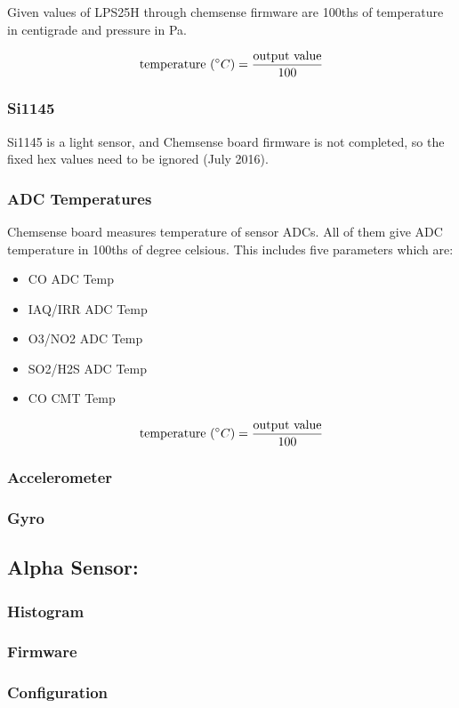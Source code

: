 Given values of LPS25H through chemsense firmware are 100ths of temperature in centigrade and pressure in Pa.

{\centering 
 \[ \text{temperature }(\degree C) = \frac{\text{output value}}{100} \]
}

\subsubsection{ Si1145}

Si1145 is a light sensor, and Chemsense board firmware is not completed, so the fixed hex values need to be ignored (July 2016).

\subsubsection{ ADC Temperatures}
Chemsense board measures temperature of sensor ADCs. All of them give ADC temperature in 100ths of degree celsious. This includes five parameters which are:
 
\begin{itemize}
  \item CO ADC Temp
  \item IAQ/IRR ADC Temp
  \item O3/NO2 ADC Temp
  \item SO2/H2S ADC Temp
  \item CO CMT Temp
\end{itemize}


{\centering 
 \[ \text{temperature }(\degree C) = \frac{\text{output value}}{100} \]
}

\subsubsection{ Accelerometer}

\subsubsection{ Gyro}

\subsection{Alpha Sensor:}
\subsubsection{ Histogram}

\subsubsection{ Firmware}

\subsubsection{ Configuration}